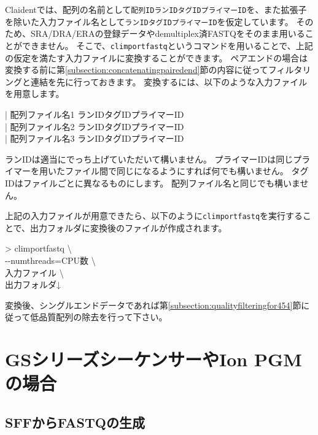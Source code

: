 \documentclass[titlepage,10pt,a4paper]{jsbook}
\newenvironment{content}{\begin{shaded}\vspace{-1em}\raggedright\ttfamily\footnotesize\setlength{\baselineskip}{1.4em}}{\end{shaded}\vspace{-1em}}
\newenvironment{cmd}{\begin{oframed}\raggedright\ttfamily\footnotesize\setlength{\baselineskip}{1.4em}}{\end{oframed}\vspace{-1em}}
\begin{document}
Claidentでは、配列の名前として\texttt{配列ID{\textunderscore}{\textunderscore}ランID{\textunderscore}{\textunderscore}タグID{\textunderscore}{\textunderscore}プライマーID}を、また拡張子を除いた入力ファイル名として\texttt{ランID{\textunderscore}{\textunderscore}タグID{\textunderscore}{\textunderscore}プライマーID}を仮定しています。
そのため、SRA/DRA/ERAの登録データやdemultiplex済FASTQをそのまま用いることができません。
そこで、\texttt{climportfastq}というコマンドを用いることで、上記の仮定を満たす入力ファイルに変換することができます。
ペアエンドの場合は変換する前に第\ref{subsection:concatenatingpairedend}節の内容に従ってフィルタリングと連結を先に行っておきます。
変換するには、以下のような入力ファイルを用意します。

\begin{content}
| 配列ファイル名1 ランID{\textunderscore}{\textunderscore}タグID{\textunderscore}{\textunderscore}プライマーID\\
| 配列ファイル名2 ランID{\textunderscore}{\textunderscore}タグID{\textunderscore}{\textunderscore}プライマーID\\
| 配列ファイル名3 ランID{\textunderscore}{\textunderscore}タグID{\textunderscore}{\textunderscore}プライマーID
\end{content}

ランIDは適当にでっち上げていただいて構いません。
プライマーIDは同じプライマーを用いたファイル間で同じになるようにすれば何でも構いません。
タグIDはファイルごとに異なるものにします。
配列ファイル名と同じでも構いません。

上記の入力ファイルが用意できたら、以下のように\texttt{climportfastq}を実行することで、出力フォルダに変換後のファイルが作成されます。

\begin{cmd}
{\textgreater} climportfastq {\textbackslash}\\
{-}{-}numthreads=CPU数 {\textbackslash}\\
入力ファイル {\textbackslash}\\
出力フォルダ↓
\end{cmd}

変換後、シングルエンドデータであれば第\ref{subsection:qualityfilteringfor454}節に従って低品質配列の除去を行って下さい。

\section{GSシリーズシーケンサーやIon PGMの場合}

\subsection{SFFからFASTQの生成}
\end{document}
